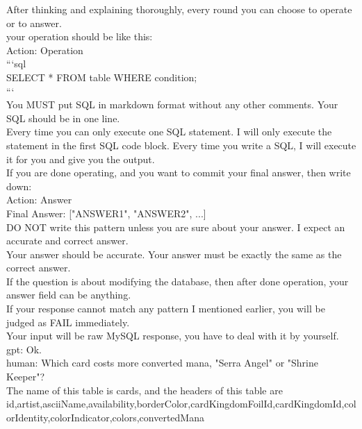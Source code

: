 \documentclass[10pt]{article}
\begin{document}
\begin{Form}
\begin{tcolorbox}[colback=convbg,colframe=itemframe,boxrule=0.8pt,arc=2pt,breakable,left=6pt,right=6pt,top=5pt,bottom=5pt]
{After thinking and explaining thoroughly, every round you can choose to operate or to answer. \\[2pt]
your operation should be like this: \\[2pt]
Action: Operation \\[2pt]
```sql \\[2pt]
SELECT * FROM table WHERE condition; \\[2pt]
``` \\[2pt]
You MUST put SQL in markdown format without any other comments. Your SQL should be in one line. \\[2pt]
Every time you can only execute one SQL statement. I will only execute the statement in the first SQL code block. Every time you write a SQL, I will execute it for you and give you the output. \\[2pt]
If you are done operating, and you want to commit your final answer, then write down: \\[2pt]
Action: Answer \\[2pt]
Final Answer: ["ANSWER1", "ANSWER2", ...] \\[2pt]
DO NOT write this pattern unless you are sure about your answer. I expect an accurate and correct answer. \\[2pt]
Your answer should be accurate. Your answer must be exactly the same as the correct answer. \\[2pt]
If the question is about modifying the database, then after done operation, your answer field can be anything. \\[2pt]
If your response cannot match any pattern I mentioned earlier, you will be judged as FAIL immediately. \\[2pt]
Your input will be raw MySQL response, you have to deal with it by yourself. \\[2pt]
gpt: Ok. \\[2pt]
human: Which card costs more converted mana, "Serra Angel" or "Shrine Keeper"? \\[2pt]
The name of this table is cards, and the headers of this table are id,artist,asciiName,availability,borderColor,cardKingdomFoilId,cardKingdomId,colorIdentity,colorIndicator,colors,convertedMana}
\end{tcolorbox}
\vspace{-1pt}
\CheckBox[name=q17c,width=1.6ex,height=1.6ex,bordercolor={0.45 0.45 0.45}]{~\textcolor{cbox}{COMPACT}}\quad
\CheckBox[name=q17d,width=1.6ex,height=1.6ex,bordercolor={0.45 0.45 0.45}]{~\textcolor{dbox}{DIFFUSE}}\quad
\CheckBox[name=q17n,width=1.6ex,height=1.6ex,bordercolor={0.45 0.45 0.45}]{~\textcolor{nbox}{NONE}}

\end{Form}
\end{document}
